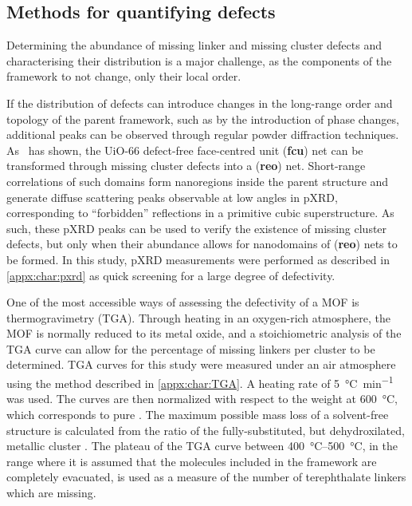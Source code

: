 \subsection{Methods for quantifying defects}

Determining the abundance of missing linker and missing cluster 
defects and characterising their distribution is a major challenge,
as the components of the framework to not change, only their local
order.

If the distribution of defects can introduce changes in the
long-range order and topology of the parent framework,
such as by the introduction of phase changes,
additional peaks can be observed through regular
powder diffraction techniques.
As~\citet{cliffeCorrelatedDefectNanoregions2014} has shown,
the UiO-66 defect-free face-centred unit (\textbf{fcu})
net can be transformed through missing cluster defects into
a (\textbf{reo}) net. Short-range correlations of such domains
form nanoregions inside the parent structure and generate
diffuse scattering peaks observable at low angles in
\gls{pXRD}, corresponding to ``forbidden''
reflections in a primitive cubic superstructure.
As such, these \gls{pXRD} peaks can be used to verify the existence of
missing cluster defects, but only when their abundance allows for
nanodomains of (\textbf{reo}) nets to be formed. In this study,
\gls{pXRD} measurements were performed as described in \autoref{appx:char:pxrd}
as quick screening for a large degree of defectivity.

One of the most accessible ways of assessing the defectivity of
a \gls{MOF} is thermogravimetry (\gls{TGA}). Through heating in
an oxygen-rich atmosphere, the \gls{MOF} is normally reduced to
its metal oxide, and a stoichiometric analysis of the \gls{TGA} curve
can allow for the percentage of missing linkers per cluster to be
determined. \gls{TGA} curves for this study were measured under
an air atmosphere using the method described in \autoref{appx:char:TGA}.
A heating rate of \SI{5}{\degreeCelsius\per\minute} was used.
The curves are then normalized with respect to the weight at
\SI{600}{\degreeCelsius}, which corresponds to pure
. The maximum possible mass loss of a solvent-free
structure is calculated from the ratio of the fully-substituted,
but dehydroxilated, metallic cluster . The plateau
of the \gls{TGA} curve between \SIrange{400}{500}{\degreeCelsius},
in the range where it is assumed that the molecules included in
the framework are completely evacuated, is used as a measure of the
number of terephthalate linkers which are missing.

